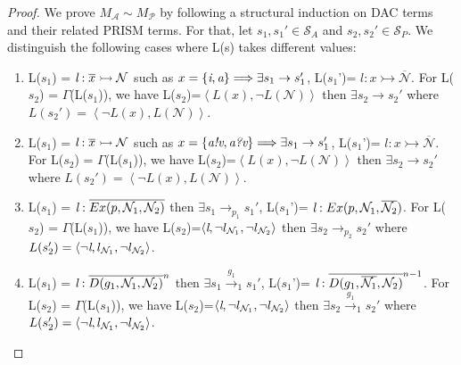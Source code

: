 \documentclass[3p,times,procedia,authoryear,round]{elsarticle}
\begin{document}
\begin{proof} We prove $M_{\mathscr{A}}\sim M_{\mathscr{P}}$ by following a structural induction on DAC terms and their related PRISM terms. For that, let $s_{1}, s_{1}' \in \mathscr{S}_{A}$ and $s_{2}, s_{2}' \in \mathscr{S}_{P}$. We distinguish the following cases where L(s) takes different values: 


\begin{enumerate}
\item L($s_{1}$) = $\emph{l} : \overline{x}  \rightarrowtail \mathcal{N} $ such as $x=\left\{\emph{i},\emph{a}\right\} \Longrightarrow \exists s_{1} \rightarrow s_{1}'$, L($s_{1}$')= $l : x \rightarrowtail \overline{\mathcal{N}}$. For L($s_{2}$) = $\Gamma$(L($s_{1}$)), we have L($s_{2}$)=$ \left\langle L(x) ,\neg L(\mathcal{N}) \right\rangle$ then $\exists s_{2} \rightarrow s_{2}'$ where $L(s_{2}') = \left\langle \neg L(x), L(\mathcal{N})\right\rangle$.
	
\item  L($s_{1}$) = $\emph{l} : \overline{x}  \rightarrowtail \mathcal{N} $ such as $x=\left\{\emph{a!v},\emph{a?v}\right\} \Longrightarrow \exists s_{1} \rightarrow s_{1}'$, L($s_{1}$')= $l : x \rightarrowtail \overline{\mathcal{N}}$. For L($s_{2}$) = $\Gamma$(L($s_{1}$)), we have L($s_{2}$)=$ \left\langle L(x) ,\neg L(\mathcal{N}) \right\rangle$ then $\exists s_{2} \rightarrow s_{2}'$ where $L(s_{2}') = \left\langle \neg L(x), L(\mathcal{N})\right\rangle$.
	
\item L($s_{1}$) = $ \emph{l}: \overline{Ex(p,\mathcal{N}_{1}, \mathcal{N}_{2} )} $ then $\exists s_{1} \rightarrow_{p_{1}} s_{1}'$, L($s_{1}$')= $\emph{l}:Ex(p,\mathcal{N}_{1}, \overline{\mathcal{N}_{2}} )$. For L($s_{2}$) = $\Gamma$(L($s_{1}$)), we have L($s_{2}$)=$ \left\langle \emph{l} ,\neg l_{\mathcal{N}_{1}} ,\neg l_{\mathcal{N}_{2}} \right\rangle$ then $\exists s_{2} \rightarrow_{p_{2}} s_{2}'$ where $L(s_{2}') = \left\langle \neg\emph{l} ,l_{\mathcal{N}_{1}} ,\neg l_{\mathcal{N}_{2}} \right\rangle$.
    
    
\item  L($s_{1}$) = $ \emph{l}:\overline{D(g_{1},\mathcal{N}_{1}, \mathcal{N}_{2})}^{n}$ then $\exists s_{1} \xrightarrow{g_{1}}_{1} s_{1}'$, L($s_{1}$')= $\emph{l}:\overline{D(g_{1},\overline{\mathcal{N}_{1}}, \mathcal{N}_{2})}^{n-1}$. For L($s_{2}$) = $\Gamma$(L($s_{1}$)), we have L($s_{2}$)=$ \left\langle \emph{l} ,\neg l_{\mathcal{N}_{1}} ,\neg l_{\mathcal{N}_{2}} \right\rangle$ then $\exists s_{2} \xrightarrow{g_{1}}_{1} s_{2}'$ where $L(s_{2}') = \left\langle \neg\emph{l} ,l_{\mathcal{N}_{1}} ,\neg l_{\mathcal{N}_{2}} \right\rangle$.
	

\end{enumerate}
\end{proof}
\end{document}
